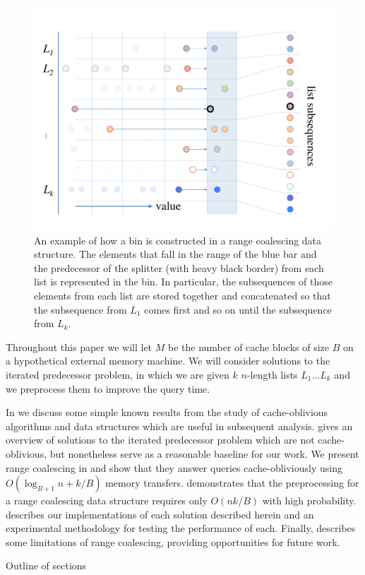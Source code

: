 \begin{figure}[h]
\includegraphics[scale=.33333]{cache-oblivious-fractional-cascading-c.pdf}
\caption{An example of how a bin is constructed in a range coalescing data
structure.  The elements that fall in the range of the blue bar and the predecessor
of the splitter (with heavy black border) from each list is represented in the bin.
In particular, the subsequences of those elements from each list are stored together
and concatenated so that the subsequence from $L_1$ comes first and so on until the
subsequence from $L_k$.}
\label{fig:coalesced_bin} 
\end{figure}

Throughout this paper we will let $M$ be the number of cache blocks of size $B$
on a hypothetical external memory machine.  We will consider solutions to the iterated
predecessor problem, in which we are given $k$ $n$-length lists $L_1 \ldots L_k$ and
we preprocess them to improve the query time.

In  we discuss some simple known results from the study of
cache-oblivious algorithms and data structures which are useful in subsequent analysis.
 gives an overview of solutions to the iterated predecessor problem
which are not cache-oblivious, but nonetheless serve as a reasonable baseline for
our work.  We present range coalescing in  and show that they
answer queries cache-obliviously using $O(\log_{B+1} n + k/B)$ memory transfers.
 demonstrates that the preprocessing for a range coalescing
data structure requires only $O(nk/B)$ with high probability.   
describes our implementations of each solution described herein and an experimental
methodology for testing the performance of each.  Finally,  
describes some limitations of range coalescing, providing opportunities for future
work.


Outline of sections

